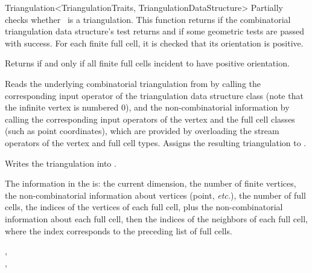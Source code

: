 \begin{ccRefClass}{Triangulation<TriangulationTraits, TriangulationDataStructure>}
{Partially checks whether \ccVar\ is a triangulation. This function returns
 if the combinatorial triangulation data structure's 
test returns  and if some geometric tests are passed with success.
For each finite full cell, it is checked that its orientation is
positive.}

 {Returns  if and only if all
finite full cells incident to  have positive orientation.}


{Reads the underlying combinatorial triangulation from  by
calling the corresponding input operator of the triangulation data
structure class (note that the infinite vertex is numbered 0), and the
non-combinatorial information by calling the corresponding input
operators of the vertex and the full cell classes (such as point
coordinates), which are provided by overloading the stream operators
of the vertex and full cell types. Assigns the resulting triangulation to
.}

{Writes the triangulation  into .}

The information in the  is: the current dimension, the number of
finite vertices, the non-combinatorial information about vertices (point,
\emph{etc.}), the number of full cells, the indices of the vertices of each
full cell, plus the non-combinatorial information about each full cell, then the
indices of the neighbors of each full cell, where the index corresponds to the
preceding list of full cells.

\ccSeeAlso

,\\
,\\

\end{ccRefClass}

